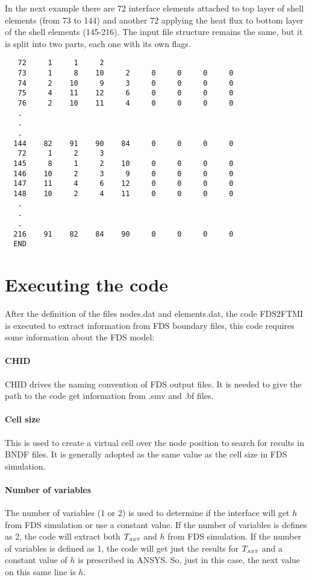 \documentclass[11pt]{book}
\begin{document}
In the next example there are 72 interface elements attached to top layer of shell elements (from 73 to 144) and another 72 applying the heat flux to bottom layer of the shell elements (145-216). The input file structure remains the same, but it is split into two parts, each one with its own flags.

\begin{verbatim}
   72     1     1     2
   73     1     8    10     2     0     0     0     0
   74     2    10     9     3     0     0     0     0
   75     4    11    12     6     0     0     0     0
   76     2    10    11     4     0     0     0     0
   .
   .
   .
  144    82    91    90    84     0     0     0     0
   72     1     2     3
  145     8     1     2    10     0     0     0     0
  146    10     2     3     9     0     0     0     0
  147    11     4     6    12     0     0     0     0
  148    10     2     4    11     0     0     0     0   
   .
   .
   .
  216    91    82    84    90     0     0     0     0   
  END
\end{verbatim}

\section{Executing the code}

After the definition of the files nodes.dat and elements.dat, the code FDS2FTMI is executed to extract information from FDS boundary files, this code requires some information about the FDS model:

\paragraph{CHID} 
{\ct CHID} drives the naming convention of FDS output files. It is needed to give the path to the code get information from .smv and .bf files. 
\paragraph{Cell size} 
This is used to create a virtual cell over the node position to search for results in {\ct BNDF} files. It is generally adopted as the same value as the cell size in FDS simulation.
\paragraph{Number of variables} 
The number of variables (1 or 2) is used to determine if the interface will get $h$ from FDS simulation or use a constant value. 
If the number of variables is defines as 2, the code will extract both $T_{\hbox{\tiny AST}}$ and $h$ from FDS simulation. If the number of variables is defined as 1, the code will get just the results for $T_{\hbox{\tiny AST}}$ and a constant value of $h$ is prescribed in A{\footnotesize NSYS}. So, just in this case, the next value on this same line is $h$. 
\end{document}

